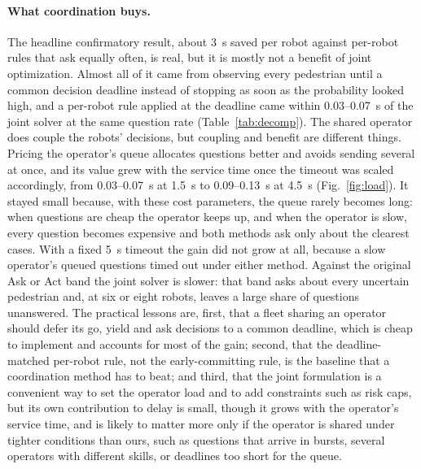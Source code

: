 \documentclass[a4paper,fleqn]{cas-dc}
\begin{document}
\paragraph{What coordination buys.} The headline confirmatory result, about \SI{3}{s} saved per robot against per-robot rules that ask equally often, is real, but it is mostly not a benefit of joint optimization. Almost all of it came from observing every pedestrian until a common decision deadline instead of stopping as soon as the probability looked high, and a per-robot rule applied at the deadline came within 0.03--\SI{0.07}{s} of the joint solver at the same question rate (Table~\ref{tab:decomp}). The shared operator does couple the robots' decisions, but coupling and benefit are different things. Pricing the operator's queue allocates questions better and avoids sending several at once, and its value grew with the service time once the timeout was scaled accordingly, from 0.03--\SI{0.07}{s} at \SI{1.5}{s} to 0.09--\SI{0.13}{s} at \SI{4.5}{s} (Fig.~\ref{fig:load}). It stayed small because, with these cost parameters, the queue rarely becomes long: when questions are cheap the operator keeps up, and when the operator is slow, every question becomes expensive and both methods ask only about the clearest cases. With a fixed \SI{5}{s} timeout the gain did not grow at all, because a slow operator's queued questions timed out under either method. Against the original Ask or Act band the joint solver is slower: that band asks about every uncertain pedestrian and, at six or eight robots, leaves a large share of questions unanswered. The practical lessons are, first, that a fleet sharing an operator should defer its go, yield and ask decisions to a common deadline, which is cheap to implement and accounts for most of the gain; second, that the deadline-matched per-robot rule, not the early-committing rule, is the baseline that a coordination method has to beat; and third, that the joint formulation is a convenient way to set the operator load and to add constraints such as risk caps, but its own contribution to delay is small, though it grows with the operator's service time, and is likely to matter more only if the operator is shared under tighter conditions than ours, such as questions that arrive in bursts, several operators with different skills, or deadlines too short for the queue.
\end{document}

